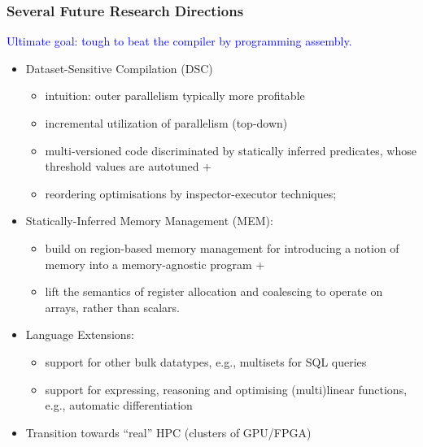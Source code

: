 \documentclass{beamer}
\newcommand{\blue}[1]{\textcolor{Blue}{{#1}}}
\newcommand{\emphh}[1]{\textcolor{CosGreen}{ #1}}
\begin{document}
\begin{frame}[fragile,t]
   \frametitle{Several Future Research Directions}

\blue{Ultimate goal: tough to beat the compiler by 
    programming assembly.}

\begin{itemize}
    \item \emphh{Dataset-Sensitive Compilation (DSC)}
        \begin{itemize}
            \item intuition: outer parallelism typically more profitable
            \item incremental utilization of parallelism (top-down)
            \item multi-versioned code discriminated by
                    statically inferred predicates,
                    whose threshold values are autotuned +
            \item reordering optimisations by inspector-executor
                    techniques;
        \end{itemize}\medskip\pause

    \item \emphh{Statically-Inferred Memory Management (MEM):}
        \begin{itemize}
                    \item build on region-based memory management for
                            introducing a notion of memory into a
                            memory-agnostic program +
                    \item lift the semantics of register allocation
                            and coalescing to operate on arrays,
                            rather than scalars.
        \end{itemize}\medskip\pause

    \item \emphh{Language Extensions:}
        \begin{itemize}
            \item support for other bulk datatypes, e.g.,
                    multisets for SQL queries
            \item support for expressing, reasoning and optimising
                    (multi)linear functions,
                    e.g., automatic differentiation
        \end{itemize}
    \medskip
    \item \emphh{Transition towards ``real'' HPC (clusters of GPU/FPGA)}
\end{itemize}
\end{frame}
\end{document}
